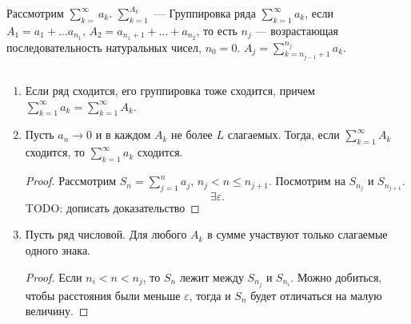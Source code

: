 % 
% 

\begin{defn}
    Рассмотрим $ \sum_{k=}^{\infty} a_k$. $ \sum_{k=1}^{A_k} $ --- Группировка ряда $ \sum_{k=1}^{\infty} a_k$, если $ A_1= a_1 + \ldots a_{n_1}$, $ A_2 = a_{n_1+1} + \ldots  + a_{n_2}$, то есть $ n_j$ --- возрастающая последовательность натуральных чисел, $ n_0= 0$. $ A_j = \sum_{k=n_{j-1}+1}^{n_j} a_k$.
\end{defn}
\begin{thm}[о группировке] 

    $ $
    \begin{enumerate}[noitemsep]
	\item Если ряд сходится, его группировка тоже сходится, причем $ \sum_{k=1}^{\infty} a_k = \sum_{k=1}^{\infty} A_k$.
	    \item Пусть $ a_n \to  0$ и в каждом  $ A_k$ не более $ L$ слагаемых. Тогда, если $ \sum_{k=1}^{\infty} A_k$ сходится, то $ \sum_{k=1}^{\infty} a_k$ сходится.

		\begin{proof}
		    Рассмотрим $ S_n = \sum_{j=1}^{n} a_j$, $ n_j < n \le n_{j+1}$. Посмотрим на $ S_{n_j}$ и $ S_{n_{j+1}}$.
		    \[
		    \exists \varepsilon 
		    .\] 
		TODO: дописать доказательство
		\end{proof}
	    \item Пусть ряд числовой. Для любого $ A_k$ в сумме участвуют только слагаемые одного знака.
		\begin{proof}
		     Если $ n_i < n < n_j$, то  $ S_{n}$ лежит между $ S_{n_j}$ и $ S_{n_i}$. Можно добиться, чтобы расстояния были меньше $ \varepsilon $, тогда и $ S_n$ будет отличаться на малую величину.
		\end{proof}
    \end{enumerate}
\end{thm}
